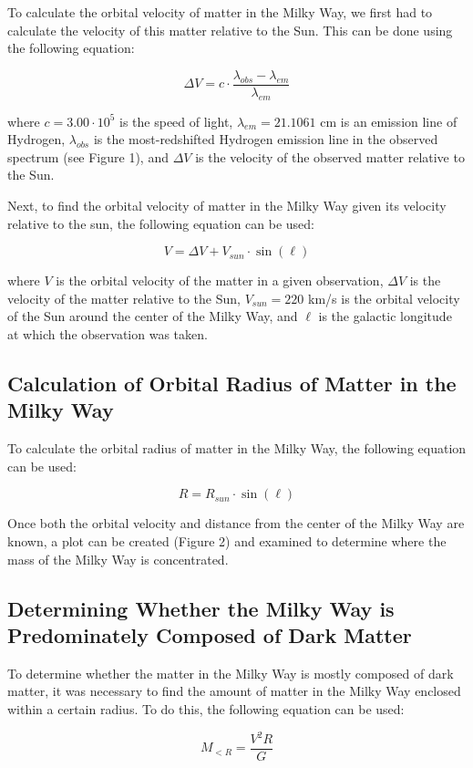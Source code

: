 \documentclass{article}
\begin{document}
To calculate the orbital velocity of matter in the Milky Way, we first had to calculate the velocity of this matter relative to the Sun.
This can be done using the following equation:

\[
\Delta V = c \cdot \frac{\lambda_{obs} - \lambda_{em}}{\lambda_{em}}
\]

where $c = 3.00 \cdot 10^5$ is the speed of light, $\lambda_{em} = 21.1061$ cm is an emission line of Hydrogen, $\lambda_{obs}$ is the most-redshifted Hydrogen emission line in the observed spectrum (see Figure 1), and $\Delta V$ is the velocity of the observed matter relative to the Sun.

Next, to find the orbital velocity of matter in the Milky Way given its velocity relative to the sun, the following equation can be used:

\[
V = \Delta V + V_{sun} \cdot \sin(\ell)
\]

where $V$ is the orbital velocity of the matter in a given observation, $\Delta V$ is the velocity of the matter relative to the Sun, $V_{sun} = 220$ km/s is the orbital velocity of the Sun around the center of the Milky Way, and $\ell$ is the galactic longitude at which the observation was taken.

\subsection{Calculation of Orbital Radius of Matter in the Milky Way}

To calculate the orbital radius of matter in the Milky Way, the following equation can be used:

\[
R = R_{sun} \cdot \sin (\ell)
\]

Once both the orbital velocity and distance from the center of the Milky Way are known, a plot can be created (Figure 2) and examined to determine where the mass of the Milky Way is concentrated.

\subsection{Determining Whether the Milky Way is Predominately Composed of Dark Matter}

To determine whether the matter in the Milky Way is mostly composed of dark matter, it was necessary to find the amount of matter in the Milky Way enclosed within a certain radius.
To do this, the following equation can be used:

\[
M_{<R} = \frac{V^2R}{G}
\]
\end{document}
